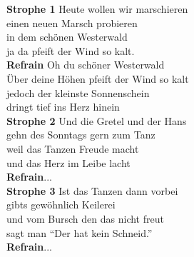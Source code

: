 \documentclass[twoside,8pt]{scrartcl}
\begin{document}
\textbf{Strophe 1}\newline
Heute wollen wir marschieren\\
einen neuen Marsch probieren\\
in dem schönen Westerwald\\
ja da pfeift der Wind so kalt.\\
\newline
\textbf{Refrain}\newline
Oh du schöner Westerwald\\
Über deine Höhen pfeift der Wind so kalt\\
jedoch der kleinste Sonnenschein\\
dringt tief ins Herz hinein\\
\newline
\textbf{Strophe 2}\newline
Und die Gretel und der Hans\\
gehn des Sonntags gern zum Tanz\\
weil das Tanzen Freude macht\\
und das Herz im Leibe lacht\\
\newline
\textbf{Refrain}...\\
\newline
\textbf{Strophe 3}\newline
Ist das Tanzen dann vorbei\\
gibts gewöhnlich Keilerei\\
und vom Bursch den das nicht freut\\
sagt man “Der hat kein Schneid.”\\
\newline
\textbf{Refrain}...

\clearpage
\end{document}
